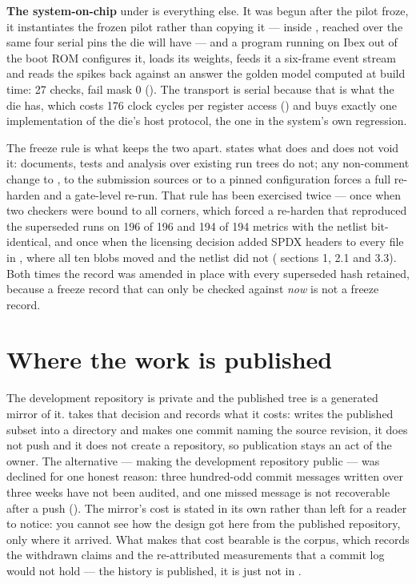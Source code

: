 \textbf{The system-on-chip} under  is everything else. It
was begun after the pilot froze, it instantiates the frozen pilot rather
than copying it ---  inside ,
reached over the same four serial pins the die will have --- and a
program running on Ibex out of the boot ROM configures it, loads its
weights, feeds it a six-frame event stream and reads the spikes back
against an answer the golden model computed at build time: 27 checks,
fail mask 0 (). The transport is serial because that is what
the die has, which costs 176 clock cycles per register access
() and buys exactly one implementation of the
die's host protocol, the one in the system's own regression.

The freeze rule is what keeps the two apart. 
states what does and does not void it: documents, tests and analysis
over existing run trees do not; any non-comment change to
, to the submission sources or to a pinned configuration
forces a full re-harden and a gate-level re-run. That rule has been
exercised twice --- once when two checkers were bound to all corners,
which forced a re-harden that reproduced the superseded runs on 196 of
196 and 194 of 194 metrics with the netlist bit-identical, and once when
the licensing decision added SPDX headers to every file in
, where all ten blobs moved and the netlist did not
( sections 1, 2.1 and 3.3). Both times the record was amended in
place with every superseded hash retained, because a freeze record that
can only be checked against \emph{now} is not a freeze record.

\section{Where the work is published}
\label{sec:intro-publication}

\begin{sloppypar}
The development repository is private and the published tree is a
generated mirror of it.  takes that decision and
records what it costs:  writes the
published subset into a directory and makes one commit naming the source
revision, it does not push and it does not create a repository, so
publication stays an act of the owner. The alternative --- making the
development repository public --- was declined for one honest reason:
three hundred-odd commit messages written over three weeks have not been
audited, and one missed message is not recoverable after a push
(). The mirror's cost is stated in its own
 rather than left for a reader to notice: you cannot see
how the design got here from the published repository, only where it
arrived. What makes that cost bearable is the corpus, which records the
withdrawn claims and the re-attributed measurements that a commit log
would not hold --- the history is published, it is just not in
.
\end{sloppypar}

